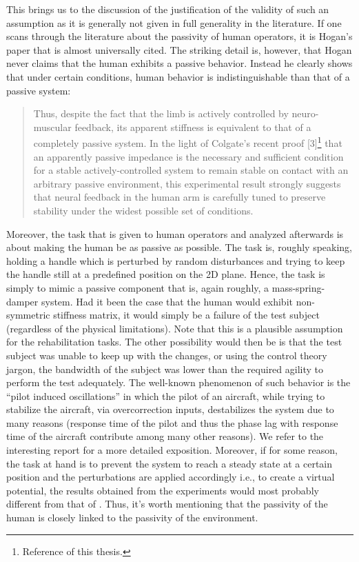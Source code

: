 This brings us to the discussion of the justification of the validity of such an assumption as it is generally not given in full generality in the
literature. If one scans through the literature about the passivity of human operators, it is Hogan's paper \cite{hogan89}
that is almost universally cited. The striking detail is, however, that Hogan never claims that the human exhibits a passive
behavior. Instead he clearly shows that under certain conditions, human behavior is indistinguishable than that of a 
passive system: 
\begin{quote}
Thus, despite the fact that the
limb is actively controlled by neuro-muscular feedback, its apparent
stiffness is equivalent to that of a completely passive
system. In the light of Colgate's recent proof [3]\footnote{Reference 
\cite{colgatehogan88} of this thesis.} that an
apparently passive impedance is the necessary and sufficient
condition for a stable actively-controlled system to remain stable
on contact with an arbitrary passive environment, this
experimental result strongly suggests that neural feedback in the
human arm is carefully tuned to preserve stability under the
widest possible set of conditions.
\end{quote}
Moreover, the task that is given to human operators and analyzed afterwards is about making the human 
be as passive as possible. The task is, roughly speaking, holding a handle which is perturbed by random disturbances and 
trying to keep the handle still at a predefined position on the 2D plane. Hence, the task is simply to mimic a passive 
component that is, again roughly, a mass-spring-damper system. Had it been the case that the human would exhibit non-symmetric 
stiffness matrix, it would simply be a failure of the test subject (regardless of the physical limitations). Note that this 
is a plausible assumption for the rehabilitation tasks. The other possibility would then be is that the test subject was unable to keep up 
with the changes, or using the control theory jargon, the bandwidth of the subject was lower than the required agility to 
perform the test adequately.  The well-known phenomenon of such behavior is the ``pilot induced oscillations'' in which the pilot
of an aircraft, while trying to stabilize the aircraft, via overcorrection inputs, destabilizes the system due to many reasons (response time of the pilot 
and thus the phase lag with response time of the aircraft contribute among many other reasons). We refer to the interesting 
report \cite{mcruer} for a more detailed exposition. Moreover, if for some reason, the task at hand is to prevent the system 
to reach a steady state at a certain position and the perturbations are applied accordingly i.e., to create a virtual potential, 
the results obtained from the experiments would most probably different from that of \cite{mussa85}. Thus, it's worth mentioning 
that the passivity of the human is closely linked to the passivity of the environment. 


